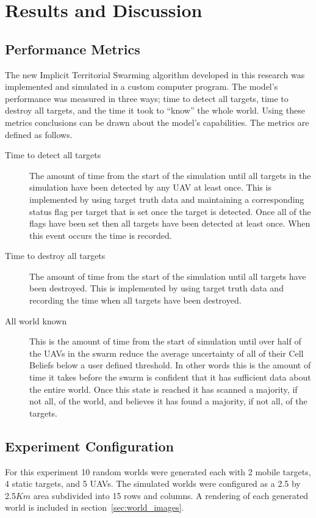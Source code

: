 \chapter{Results and Discussion}
\label{chap:results}

\section{Performance Metrics}
The new Implicit Territorial Swarming algorithm developed in this research was implemented and simulated in a custom computer program.  The model's performance was measured in three ways; time to detect all targets, time to destroy all targets, and the time it took to ``know'' the whole world.  Using these metrics conclusions can be drawn about the model's capabilities.  The metrics are defined as follows.

\begin{description}
	\item [Time to detect all targets] The amount of time from the start of the simulation until all targets in the simulation have been detected by any UAV at least once.  This is implemented by using target truth data and maintaining a corresponding status flag per target that is set once the target is detected.  Once all of the flags have been set then all targets have been detected at least once.  When this event occurs the time is recorded.
	
	\item[Time to destroy all targets] The amount of time from the start of the simulation until all targets have been destroyed.  This is implemented by using target truth data and recording the time when all targets have been destroyed.
	
	\item[All world known] This is the amount of time from the start of simulation until over half of the UAVs in the swarm reduce the average uncertainty of all of their Cell Beliefs below a user defined threshold.  In other words this is the amount of time it takes before the swarm is confident that it has sufficient data about the entire world.  Once this state is reached it has scanned a majority, if not all, of the world, and believes it has found a majority, if not all, of the targets.
\end{description}


\section{Experiment Configuration}
For this experiment 10 random worlds were generated each with 2 mobile targets, 4 static targets, and 5 UAVs.  The simulated worlds were configured as a 2.5 by 2.5$Km$ area subdivided into 15 rows and columns.  A rendering of each generated world is included in section~\ref{sec:world_images}.

